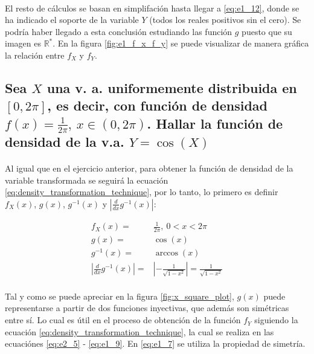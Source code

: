 \documentclass{article}
\begin{document}
    \paragraph{}
    El resto de cálculos se basan en simplifación hasta llegar a \eqref{eq:e1_12}, donde se ha indicado el soporte de la variable $Y$ (todos los reales positivos sin el cero). Se podría haber llegado a esta conclusión estudiando las función $g$ puesto que su imagen es  $\mathbb{R^*}$. En la figura \ref{fig:e1_f_x_f_y} se puede visualizar de manera gráfica la relación entre $f_X$ y $f_Y$.

  \subsection{Sea $X$ una v. a. uniformemente distribuida en $[0,2\pi]$, es decir, con función de densidad $f(x)=\frac{1}{2\pi}, \ x \in (0,2\pi)$. Hallar la función de densidad de la v.a. $Y = \cos(X)$}

    \paragraph{}
    Al igual que en el ejercicio anterior, para obtener la función de densidad de la variable transformada se seguirá la ecuación \eqref{eq:density_transformation_technique}, por lo tanto, lo primero es definir $f_X(x)$, $g(x)$, $g^{-1}(x)$ y $\left| \frac{d}{dx} g^{-1} (x) \right|$:

    \begin{align}
    \label{eq:e2_1}
      f_X(x) =& \frac{1}{2\pi}, \ 0 < x < 2\pi \\
    \label{eq:e2_2}
      g(x) =& \cos(x) \\
    \label{eq:e2_3}
      g^{-1}(x) =& \arccos(x) \\
    \label{eq:e2_4}
      \left| \frac{d}{dx} g^{-1} (x) \right| =& \left| - \frac{1}{\sqrt{1-x^2}} \right| =  \frac{1}{\sqrt{1-x^2}}
    \end{align}

    \paragraph{}
    Tal y como se puede apreciar en la figura \ref{fig:x_square_plot}, $g(x)$ puede representarse a partir de dos funciones inyectivas, que además son simétricas entre sí. Lo cual es útil en el proceso de obtención de la función $f_Y$ siguiendo la ecuación \eqref{eq:density_transformation_technique}, la cual se realiza en las ecuaciónes \eqref{eq:e2_5} - \eqref{eq:e1_9}. En \eqref{eq:e1_7} se utiliza la propiedad de simetría.
\end{document}
